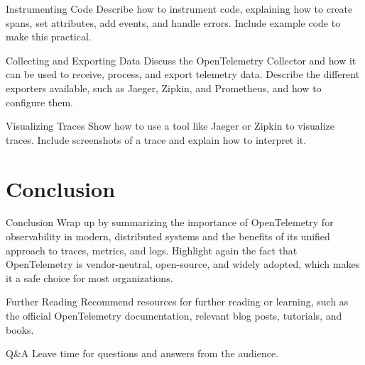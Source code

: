 \documentclass[aspectratio=169]{beamer}
\begin{document}
\begin{frame}{Instrumenting Code}
  Describe how to instrument code, explaining how to create spans, set attributes, add events, and handle errors. Include example code to make this practical.
\end{frame}

\begin{frame}{Collecting and Exporting Data}
  Discuss the OpenTelemetry Collector and how it can be used to receive, process, and export telemetry data. Describe the different exporters available, such as Jaeger, Zipkin, and Prometheus, and how to configure them.
\end{frame}

\begin{frame}{Visualizing Traces}
  Show how to use a tool like Jaeger or Zipkin to visualize traces. Include screenshots of a trace and explain how to interpret it.
\end{frame}

\section{Conclusion}

\begin{frame}{Conclusion}
  Wrap up by summarizing the importance of OpenTelemetry for observability in modern, distributed systems and the benefits of its unified approach to traces, metrics, and logs. Highlight again the fact that OpenTelemetry is vendor-neutral, open-source, and widely adopted, which makes it a safe choice for most organizations.
\end{frame}

\begin{frame}{Further Reading}
  Recommend resources for further reading or learning, such as the official OpenTelemetry documentation, relevant blog posts, tutorials, and books.
\end{frame}

\begin{frame}{Q\&A}
  Leave time for questions and answers from the audience.
\end{frame}
\end{document}
